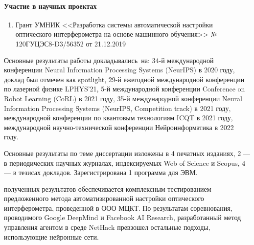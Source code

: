 \paragraph{Участие в научных проектах}
\begin{enumerate}[labelindent=3pt, labelsep=10pt, topsep=10pt, itemsep=5pt]
    \item Грант УМНИК <<Разработка системы автоматической настройки оптического интерферометра на основе машинного обучения>> № 120ГУЦЭС8-D3/56352 от 21.12.2019

\end{enumerate}
\else 

{\probation} Основные результаты работы докладывались~на: 34-й международной конференции Neural Information Processing Systems (NeurIPS) в 2020 году, доклад был отмечен как spotlight, 29-й ежегодной международной конференции по лазерной физике LPHYS'21, 5-й международной конференции Conference on Robot Learning (CoRL) в 2021 году, 35-й международной конференции Neural Information Processing Systems (NeurIPS, Competition track) в 2021 году, международной конференции по квантовым технологиям ICQT в 2021 году, международной научно-технической конференции Нейроинформатика в 2022 году.

{\publications} Основные результаты по теме диссертации изложены в 4 печатных изданиях, 2 — в периодических научных журналах, индексируемых Web of Science и Scopus, 4 — в тезисах докладов. Зарегистрирована 1 программа для ЭВМ.
\fi

{\reliability} полученных результатов обеспечивается комплексным тестированием предложенного метода автоматизированной настройки оптического интерферометра, проведенной в ООО МЦКТ. По результатам 
соревнования, проводимого Google DeepMind и Facebook AI Research, разработанный метод управления агентом в среде NetHack превзошел остальные подходы, использующие нейронные сети. 
